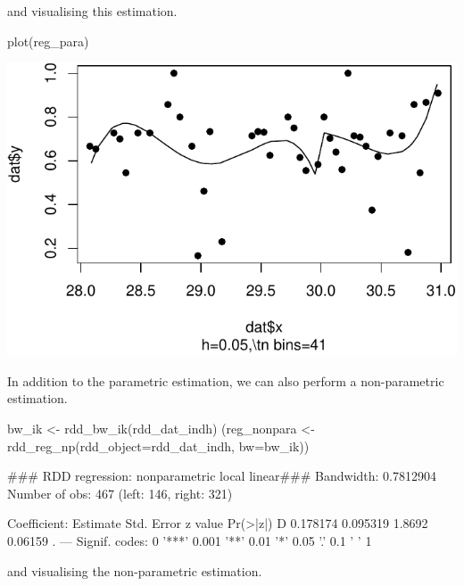 \documentclass[article]{jss}
\begin{document}
and visualising this estimation.

\begin{CodeChunk}
\begin{CodeInput}
plot(reg_para)
\end{CodeInput}


\begin{center}\includegraphics{README_files/figure-latex/unnamed-chunk-9-1} \end{center}

\end{CodeChunk}

In addition to the parametric estimation, we can also perform a
non-parametric estimation.

\begin{CodeChunk}
\begin{CodeInput}
bw_ik <- rdd_bw_ik(rdd_dat_indh)
(reg_nonpara <- rdd_reg_np(rdd_object=rdd_dat_indh, bw=bw_ik))
\end{CodeInput}
\begin{CodeOutput}
### RDD regression: nonparametric local linear###
    Bandwidth:  0.7812904 
    Number of obs: 467 (left: 146, right: 321)

    Coefficient:
  Estimate Std. Error z value Pr(>|z|)  
D 0.178174   0.095319  1.8692  0.06159 .
---
Signif. codes:  0 '***' 0.001 '**' 0.01 '*' 0.05 '.' 0.1 ' ' 1
\end{CodeOutput}
\end{CodeChunk}

and visualising the non-parametric estimation.
\end{document}
